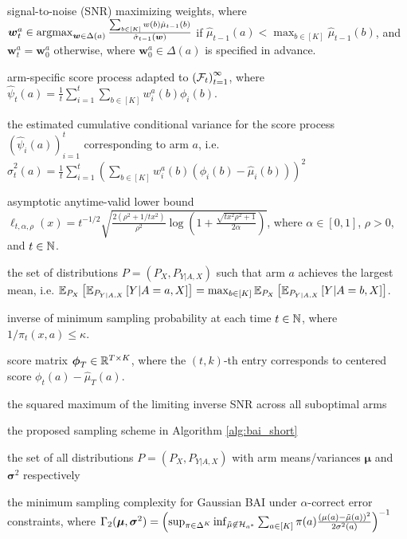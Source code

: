 \documentclass{article}
\begin{document}
\begin{appendices}
\begin{description}[
  leftmargin=2.2cm,
  labelwidth=2cm,
  labelsep=.2cm,
  parsep=0mm,
  itemsep=2pt
  ]
\item [$(\bm{w}_t^a)_{t=1}^\infty$] signal-to-noise (SNR) maximizing weights, where $\bm{w}_t^a \in \argmax_{\bm{w}\in\Delta(a)} \frac{\sum_{b \in [K]}w(b) \hat\mu_{t-1}(b)}{\hat\sigma_{t-1}(\bm{w})}$ if $\hat\mu_{t-1}(a) < \max_{b \in [K]}\hat\mu_{t-1}(b)$, and $\bm{w}_t^a = \bm{w}_0^a$ otherwise, where $\bm{w}_0^a \in \Delta(a)$ is specified in advance. 
\item [$\left(\hat\psi_t(a)\right)_{t=1}^\infty$] arm-specific score process adapted to $\left(\mathcal{F}_t\right)_{t=1}^\infty$, where $\hat\psi_t(a) = \frac{1}{t}\sum_{i=1}^t \sum_{b \in [K]}w_i^a(b) \phi_i(b)$.
\item[$\hat\sigma^2_t(a)$] the estimated cumulative conditional variance for the score process $\left(\hat\psi_i(a)\right)_{i=1}^t$ corresponding to arm $a$, i.e. $\hat\sigma^2_t(a) = \frac{1}{t}\sum_{i=1}^t \left(\sum_{b \in [K]} w_i^a(b) \left(\phi_i(b) - \hat\mu_i(b)\right)\right)^2$ 
\item[$\ell_{t,\alpha,\rho}(x)$] asymptotic anytime-valid lower bound $\ell_{t,\alpha,\rho}(x) = t^{-1/2}\sqrt{\frac{2(\rho^2+1/tx^2)}{\rho^2}\log\left(1+\frac{\sqrt{t x^2\rho^2 + 1}}{2\alpha}\right)}$, where $\alpha \in [0,1]$, $\rho > 0$,  and $t \in \mathbb{N}$. 
\item [$\Hcal_a$] the set of distributions $P = (P_X, P_{Y|A,X})$ such that arm $a$ achieves the largest mean, i.e. $\mathbb{E}_{P_X}\left[ \mathbb{E}_{P_{Y|A,X}}\left[Y|A=a, X\right]\right] = \max_{b \in [K]}\mathbb{E}_{P_X}\left[ \mathbb{E}_{P_{Y|A,X}}\left[Y|A=b, X\right]\right]$. 
\item [$\kappa$] inverse of minimum sampling probability at each time $t \in \mathbb{N}$, where $1/\pi_t(x,a) \leq \kappa$. 
\item [$\bm\phi_T$] score matrix $\boldsymbol\phi_T \in \mathbb{R}^{T\times K}$, where the $(t,k)$-th entry corresponds to centered score $\phi_t(a) - \hat\mu_T(a)$.  
\item[$\Gamma_1$] the squared maximum of the limiting inverse SNR across all suboptimal arms
\item[$\pi_t^\kappa$] the proposed sampling scheme in Algorithm \ref{alg:bai_short}
\item[$\Pcal(\bm{\mu}, \bm{\sigma}^2)$] the set of all distributions $P = (P_X, P_{Y|A,X})$ with arm means/variances $\bm{\mu}$ and $\bm{\sigma}^2$ respectively
\item[$\Gamma_2(\bm{\mu}, \bm{\sigma}^2)$] the minimum sampling complexity for Gaussian BAI under $\alpha$-correct error constraints, where $\Gamma_2(\boldsymbol{\mu}, \boldsymbol{\sigma}^2) = \left(\sup_{\pi \in \Delta^K} \inf_{\tilde\mu \not\in \mathcal{H}_{a^*}} \sum_{a \in [K]} \pi(a) \frac{\left(\mu(a) - \tilde\mu(a)\right)^2}{2\sigma^2(a)} \right)^{-1}$



\end{description}
\end{appendices}
\end{document}
